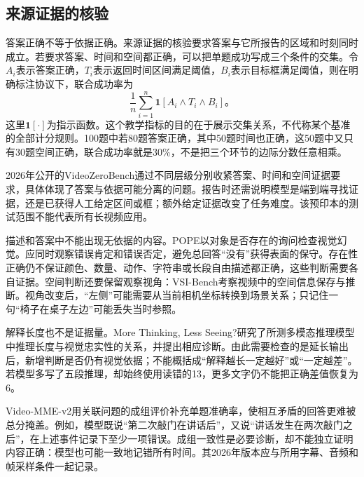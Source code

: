 \subsection{来源证据的核验}
\label{sec:vision-understanding-grounded-evaluation}

答案正确不等于依据正确。来源证据的核验要求答案与它所报告的区域和时刻同时成立。若要求答案、时间和空间都正确，可以把单题成功写成三个条件的交集。令$A_i$表示答案正确，$T_i$表示返回时间区间满足阈值，$B_i$表示目标框满足阈值，则在明确标注协议下，联合成功率为
\begin{equation}
  \frac1n\sum_{i=1}^{n}\bm 1[A_i\land T_i\land B_i]\text{。}
  \label{eq:vision-grounded-success}
\end{equation}
这里$\bm1[\cdot]$为指示函数。这个教学指标的目的在于展示交集关系，不代称某个基准的全部计分规则。100题中若80题答案正确，其中50题时间也正确，这50题中又只有30题空间正确，联合成功率就是30\%，不是把三个环节的边际分数任意相乘。

2026年公开的VideoZeroBench通过不同层级分别收紧答案、时间和空间证据要求，具体体现了答案与依据可能分离的问题。报告时还需说明模型是端到端寻找证据，还是已获得人工给定区间或框；额外给定证据改变了任务难度。该预印本的测试范围不能代表所有长视频应用。

描述和答案中不能出现无依据的内容。POPE以对象是否存在的询问检查视觉幻觉。应同时观察错误肯定和错误否定，避免总回答“没有”获得表面的保守。存在性正确仍不保证颜色、数量、动作、字符串或长段自由描述都正确，这些判断需要各自证据。空间判断还要保留观察视角：VSI-Bench考察视频中的空间信息保存与推断。视角改变后，“左侧”可能需要从当前相机坐标转换到场景关系；只记住一句“椅子在桌子左边”可能丢失当时参照。

解释长度也不是证据量。More Thinking, Less Seeing?研究了所测多模态推理模型中推理长度与视觉忠实性的关系，并提出相应诊断。由此需要检查的是延长输出后，新增判断是否仍有视觉依据；不能概括成“解释越长一定越好”或“一定越差”。若模型多写了五段推理，却始终使用读错的13，更多文字仍不能把正确差值恢复为6。

Video-MME-v2用关联问题的成组评价补充单题准确率，使相互矛盾的回答更难被总分掩盖。例如，模型既说“第二次敲门在讲话后”，又说“讲话发生在两次敲门之后”，在上述事件记录下至少一项错误。成组一致性是必要诊断，却不能独立证明内容正确：模型也可能一致地记错所有时间。其2026年版本应与所用字幕、音频和帧采样条件一起记录。

